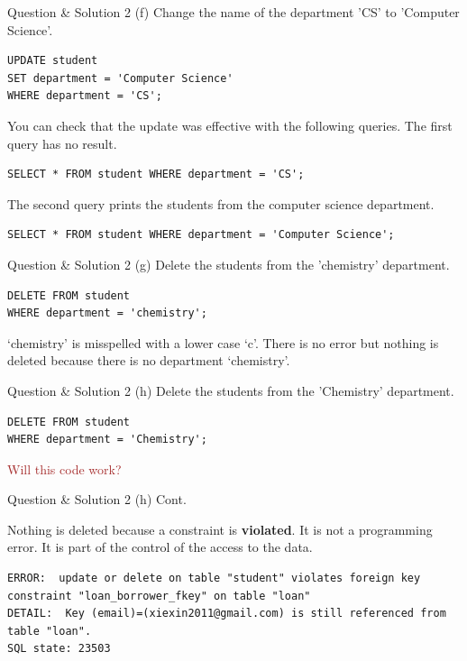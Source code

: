 \begin{frame}[fragile]{Question \& Solution 2 (f)}
Change the name of the department 'CS' to 'Computer Science'.

\begin{lstlisting}
UPDATE student
SET department = 'Computer Science'
WHERE department = 'CS';
\end{lstlisting}

You can check that the update was effective with the following queries.
The first query has no result.
\begin{lstlisting}
SELECT * FROM student WHERE department = 'CS';
\end{lstlisting}

The second query prints the students from the computer science department.
\begin{lstlisting}
SELECT * FROM student WHERE department = 'Computer Science';
\end{lstlisting}
\end{frame}

\begin{frame}[fragile]{Question \& Solution 2 (g)}
Delete the students from the 'chemistry' department.

\begin{lstlisting} 
DELETE FROM student 
WHERE department = 'chemistry';
\end{lstlisting}

`chemistry' is misspelled with a lower case `c'. There is no error but nothing is deleted because there is no department `chemistry'.
\end{frame}

\begin{frame}[fragile]{Question \& Solution 2 (h)}
Delete the students from the 'Chemistry' department.

\begin{lstlisting}
DELETE FROM student 
WHERE department = 'Chemistry';
\end{lstlisting}

\textcolor{brown}{Will this code work?}
\end{frame}

\begin{frame}[fragile]{Question \& Solution 2 (h) Cont.}

Nothing is deleted because a constraint is \textbf{violated}. It is not a programming error. It is part of the control of the access to the data.
\begin{lstlisting}[style=error]
ERROR:  update or delete on table "student" violates foreign key constraint "loan_borrower_fkey" on table "loan"
DETAIL:  Key (email)=(xiexin2011@gmail.com) is still referenced from table "loan".
SQL state: 23503
\end{lstlisting}
\end{frame}


